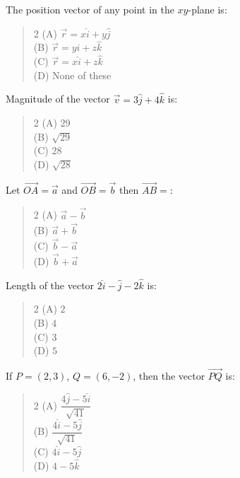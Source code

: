 \documentclass[11pt,a4paper]{article}
\begin{document}
\begin{mcqlist}
\item The position vector of any point in the $xy$-plane is:
\begin{quote}\begin{multicols}{2}
\noindent (A) $\vec{r}=x\hat{i}+y\hat{j}$ \\
(B) $\vec{r}=y\hat{i}+z\hat{k}$ \\
(C) $\vec{r}=x\hat{i}+z\hat{k}$ \\
(D) None of these
\end{multicols}\end{quote}

\item Magnitude of the vector $\vec{v}=3\hat{j}+4\hat{k}$ is:
\begin{quote}\begin{multicols}{2}
\noindent (A) $29$ \\
(B) $\sqrt{29}$ \\
(C) $28$ \\
(D) $\sqrt{28}$
\end{multicols}\end{quote}

\item Let $\overrightarrow{OA}=\vec{a}$ and $\overrightarrow{OB}=\vec{b}$ then $\overrightarrow{AB}=$:
\begin{quote}\begin{multicols}{2}
\noindent (A) $\vec{a}-\vec{b}$ \\
(B) $\vec{a}+\vec{b}$ \\
(C) $\vec{b}-\vec{a}$ \\
(D) $\vec{b}+\vec{a}$
\end{multicols}\end{quote}

\item Length of the vector $2\hat{i}-\hat{j}-2\hat{k}$ is:
\begin{quote}\begin{multicols}{2}
\noindent (A) $2$ \\
(B) $4$ \\
(C) $3$ \\
(D) $5$
\end{multicols}\end{quote}

\item If $P=(2,3)$, $Q=(6,-2)$, then the vector $\overrightarrow{PQ}$ is:
\begin{quote}\begin{multicols}{2}
\noindent (A) $\dfrac{4\hat{j}-5\hat{i}}{\sqrt{41}}$ \\
(B) $\dfrac{4\hat{i}-5\hat{j}}{\sqrt{41}}$ \\
(C) $4\hat{i}-5\hat{j}$ \\
(D) $4-5\hat{k}$
\end{multicols}\end{quote}


\end{mcqlist}
\end{document}
